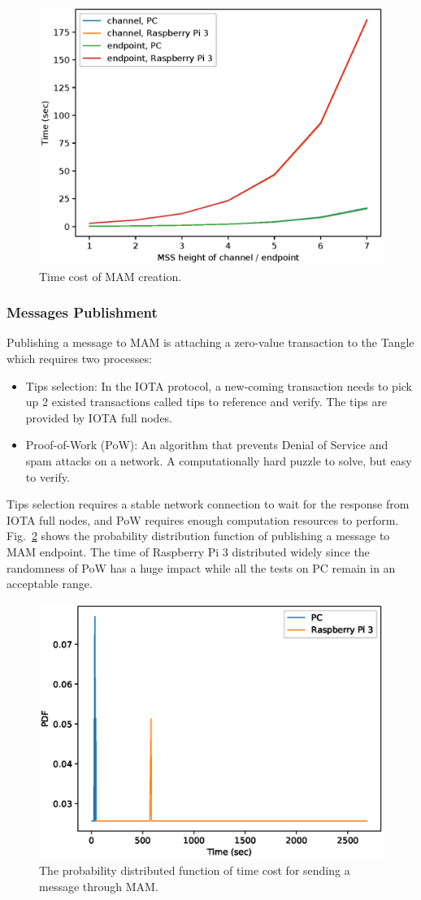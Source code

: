 \documentclass[conference]{IEEEtran}
\begin{document}
\begin{figure}[!t]
    \centering
    \includegraphics[width=3.in]{mam_create}
    \caption{Time cost of MAM creation.}
    \label{fig:mam_create}
\end{figure}

\subsubsection{Messages Publishment}
Publishing a message to MAM is attaching a zero-value transaction to the Tangle which requires two processes:
\begin{itemize}
    \item    Tips selection: In the IOTA protocol, a new-coming transaction needs to pick up 2 existed transactions called tips to reference and verify. The tips are provided by IOTA full nodes.
    \item    Proof-of-Work (PoW): An algorithm that prevents Denial of Service and spam attacks on a network. A computationally hard puzzle to solve, but easy to verify.
\end{itemize}

Tips selection requires a stable network connection to wait for the response from IOTA full nodes, and PoW requires enough computation resources to perform. Fig.~\ref{fig:mam_send} shows the probability distribution function of publishing a message to MAM endpoint. The time of Raspberry Pi 3 distributed widely since the randomness of PoW has a huge impact while all the tests on PC remain in an acceptable range.

\begin{figure}[!t]
    \centering
    \includegraphics[width=3.in]{mam_send}
    \caption{The probability distributed function of time cost for sending a message through MAM.}
    \label{fig:mam_send}
\end{figure}
\end{document}
